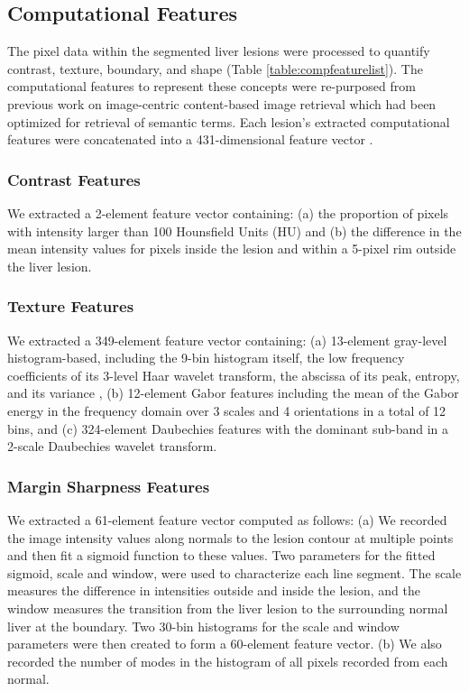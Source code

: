 \subsection{Computational Features}
The pixel data within the segmented liver lesions were processed to quantify contrast, texture, boundary, and shape (Table \ref{table:compfeaturelist}).
The computational features to represent these concepts were re-purposed from previous work on image-centric content-based image retrieval\cite{Xu:2012bh,Napel:2010vb} which had been optimized for retrieval of semantic terms.
Each lesion's extracted computational features were concatenated into a 431-dimensional feature vector .

\subsubsection{Contrast Features}
We extracted a 2-element feature vector containing: (a) the proportion of pixels with intensity larger than 100 Hounsfield Units (HU) and (b) the difference in the mean intensity values for pixels inside the lesion and within a 5-pixel rim outside the liver lesion.

\subsubsection{Texture Features}
We extracted a 349-element feature vector containing: (a) 13-element gray-level histogram-based, including the 9-bin histogram itself, the low frequency coefficients of its 3-level Haar wavelet transform, the abscissa of its peak, entropy, and its variance \cite{Strela:2002vq}, (b) 12-element Gabor features \cite{Zhao:2005wb} including the mean of the Gabor energy in the frequency domain over 3 scales and 4 orientations in a total of 12 bins, and (c) 324-element Daubechies features with the dominant sub-band in a 2-scale Daubechies wavelet transform.

\subsubsection{Margin Sharpness Features}
We extracted a 61-element feature vector computed as follows: (a) We recorded the image intensity values along normals to the lesion contour at multiple points and then fit a sigmoid function to these values.
Two parameters for the fitted sigmoid, scale and window, were used to characterize each line segment.
The scale measures the difference in intensities outside and inside the lesion, and the window measures the transition from the liver lesion to the surrounding normal liver at the boundary.
Two 30-bin histograms for the scale and window parameters were then created to form a 60-element feature vector.
(b) We also recorded the number of modes in the histogram of all pixels recorded from each normal.


